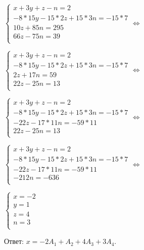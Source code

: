 \begin{multicols}{2}
$ \begin{cases}
x + 3y + z - n = 2 \\
 -8*15y - 15*2z + 15*3n = -15*7\\
 10z +85n = 295\\
  66z - 75n = 39\\
\end{cases}  \Longleftrightarrow $

$ \begin{cases}
x + 3y + z - n = 2 \\
 -8*15y - 15*2z + 15*3n = -15*7\\
  2z +17n = 59\\
  22z - 25n = 13\\
\end{cases}  \Longleftrightarrow $

$ \begin{cases}
x + 3y + z - n = 2 \\
 -8*15y - 15*2z + 15*3n = -15*7\\
  -22z -17*11n = -59*11\\
  22z - 25n = 13\\
\end{cases}  \Longleftrightarrow $

$ \begin{cases}
x + 3y + z - n = 2 \\
 -8*15y - 15*2z + 15*3n = -15*7\\
  -22z -17*11n = -59*11\\
   - 212n = -636\\
\end{cases}  \Longleftrightarrow $

$ \begin{cases}
x = -2 \\
 y = 1\\
  z = 4\\
   n =3\\
\end{cases}  $


\end{multicols}

Ответ: $x = -2A_1 + A_2 + 4A_3 + 3A_4$.

\clearpage